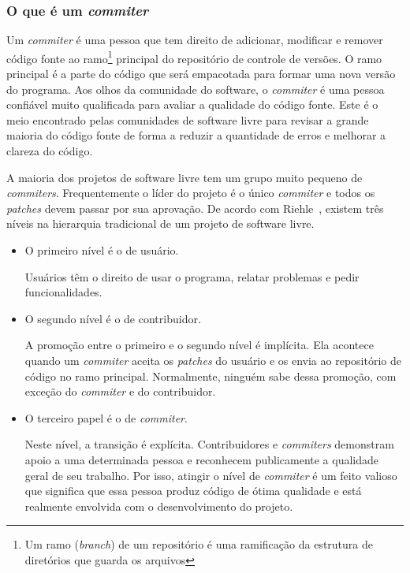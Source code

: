 \subsubsection{O que é um \emph{commiter}}

Um \emph{commiter} é uma pessoa que tem direito de adicionar,
modificar e remover código fonte ao ramo\footnote{Um ramo
  (\emph{branch}) de um repositório é uma ramificação da estrutura de
  diretórios que guarda os arquivos} principal do repositório de
controle de versões. O ramo principal é a parte do código que será
empacotada para formar uma nova versão do programa. Aos olhos da
comunidade do software, o \emph{commiter} é uma pessoa confiável muito
qualificada para avaliar a qualidade do código fonte. Este é o meio
encontrado pelas comunidades de software livre para revisar a grande
maioria do código fonte de forma a reduzir a quantidade de erros e
melhorar a clareza do código.

A maioria dos projetos de software livre tem um grupo muito pequeno de
\emph{commiters}. Frequentemente o líder do projeto é o único
\emph{commiter} e todos os \emph{patches} devem passar por sua
aprovação. De acordo com Riehle~\cite{Riehle2007}, existem três níveis
na hierarquia tradicional de um projeto de software livre.

\begin{itemize}
\item O primeiro nível é o de usuário.

  Usuários têm o direito de usar o programa, relatar problemas e pedir
  funcionalidades.
\item O segundo nível é o de contribuidor.

  A promoção entre o primeiro e o segundo nível é implícita. Ela
  acontece quando um \emph{commiter} aceita os \emph{patches} do
  usuário e os envia ao repositório de código no ramo
  principal. Normalmente, ninguém sabe dessa promoção, com exceção do
  \emph{commiter} e do contribuidor.
\item O terceiro papel é o de \emph{commiter}.

  Neste nível, a transição é explícita. Contribuidores e
  \emph{commiters} demonstram apoio a uma determinada pessoa e
  reconhecem publicamente a qualidade geral de seu trabalho. Por isso,
  atingir o nível de \emph{commiter} é um feito valioso que significa
  que essa pessoa produz código de ótima qualidade e está realmente
  envolvida com o desenvolvimento do projeto.
\end{itemize}

